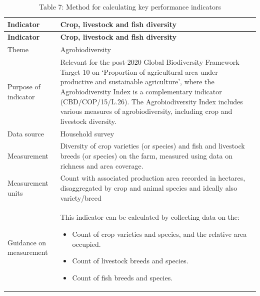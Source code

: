 \documentclass[
  letterpaper,
  DIV=11,
  numbers=noendperiod]{scrreprt}
\providecommand{\tightlist}{%
  \setlength{\itemsep}{0pt}\setlength{\parskip}{0pt}}
\begin{document}
\begin{longtable}[]{@{}
  >{\raggedright\arraybackslash}p{}
  >{\raggedright\arraybackslash}p{}@{}}
\caption{Table 7: Method for calculating key performance
indicators}\tabularnewline
\toprule\noalign{}
\begin{minipage}[b]{\linewidth}\raggedright
\textbf{Indicator}
\end{minipage} & \begin{minipage}[b]{\linewidth}\raggedright
\textbf{Crop, livestock and fish diversity}
\end{minipage} \\
\midrule\noalign{}
\endfirsthead
\toprule\noalign{}
\begin{minipage}[b]{\linewidth}\raggedright
\textbf{Indicator}
\end{minipage} & \begin{minipage}[b]{\linewidth}\raggedright
\textbf{Crop, livestock and fish diversity}
\end{minipage} \\
\midrule\noalign{}
\endhead
\bottomrule\noalign{}
\endlastfoot
Theme & Agrobiodiversity \\
Purpose of indicator & Relevant for the post-2020 Global Biodiversity
Framework Target 10 on `Proportion of agricultural area under productive
and sustainable agriculture', where the Agrobiodiversity Index is a
complementary indicator (CBD/COP/15/L.26). The Agrobiodiversity Index
includes various measures of agrobiodiversity, including crop and
livestock diversity. \\
Data source & Household survey \\
Measurement & Diversity of crop varieties (or species) and fish and
livestock breeds (or species) on the farm, measured using data on
richness and area coverage. \\
Measurement units & Count with associated production area recorded in
hectares, disaggregated by crop and animal species and ideally also
variety/breed \\
Guidance on measurement & \begin{minipage}[t]{\linewidth}\raggedright
This indicator can be calculated by collecting data on the:

\begin{itemize}
\tightlist
\item
  Count of crop varieties and species, and the relative area occupied.
\item
  Count of livestock breeds and species.
\item
  Count of fish breeds and species.
\end{itemize}


\end{minipage}
\end{longtable}
\end{document}
